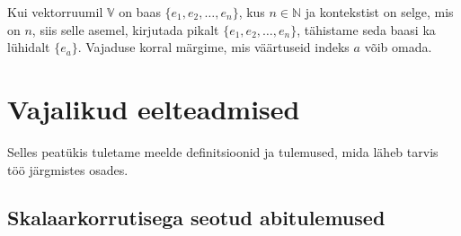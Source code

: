 \documentclass[12pt,a4paper,oneside]{article}
\theoremstyle{plain}
\theoremstyle{definition}
\numberwithin{equation}{section}
\def\N{{\mathbb N}}
\def\V{{\mathbb V}}
\begin{document}
Kui vektorruumil $\V$ on baas $\{e_1, e_2, \ldots, e_n\}$, kus 
$n \in \N$ ja kontekstist on selge, mis on $n$, siis selle 
asemel, kirjutada pikalt $\{e_1, e_2, \ldots, e_n\}$, tähistame 
seda baasi ka lühidalt $\{e_a\}$. Vajaduse korral märgime, mis 
väärtuseid indeks $a$ võib omada.

\newpage
\section{Vajalikud eelteadmised}

Selles peatükis tuletame meelde definitsioonid ja tulemused, mida 
läheb tarvis töö järgmistes osades.

\subsection{Skalaarkorrutisega seotud abitulemused}
\label{eelteadmised:skalaar}
\end{document}
